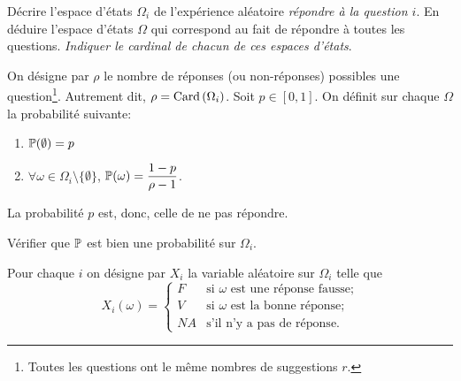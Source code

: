 \documentclass[11pt, a4paper]{article}
\begin{document}
\begin{question}{2}
  Décrire l'espace d'états $\Omega_i$ de l'expérience aléatoire
  \textit{répondre à la question $i$}. En déduire l'espace d'états
  $\Omega$ qui correspond au fait de répondre à toutes les
  questions. \emph{Indiquer le cardinal de chacun de ces espaces
    d'états}.
\end{question}

On désigne par $\rho$ le nombre de réponses (ou non-réponses)
possibles une question\footnote{Toutes les questions ont le même
  nombres de suggestions $r$.}. Autrement dit,
$\rho = \mathrm{Card}\left(\Omega_i\right)$. Soit $p \in [0, 1]$. On définit sur chaque
$\Omega$ la probabilité suivante:
\begin{enumerate}
\item[\textbullet]
  $\mathbb{P}(\emptyset) = p$
\item[\textbullet]
  $\forall \omega \in \Omega_i\setminus \{\emptyset\}$,
  $\mathbb{P}(\omega) = \displaystyle{\frac{1-p}{\rho-1}}$.
\end{enumerate}
La probabilité $p$ est, donc, celle de ne pas répondre.
\begin{question}{2}
  Vérifier que $\mathbb{P}$ est bien une probabilité sur
  $\Omega_i$.
\end{question}
Pour chaque $i$ on désigne par $X_i$ la variable aléatoire sur
$\Omega_i$ telle que
\[
X_i(\omega) = \left\{
  \begin{matrix}
    F & \textrm{si $\omega$ est une réponse fausse;}\\
    V & \textrm{si $\omega$ est la bonne réponse;}\\
    NA & \textrm{s'il n'y a pas de réponse.}
  \end{matrix}
  \right.
\]
\end{document}

